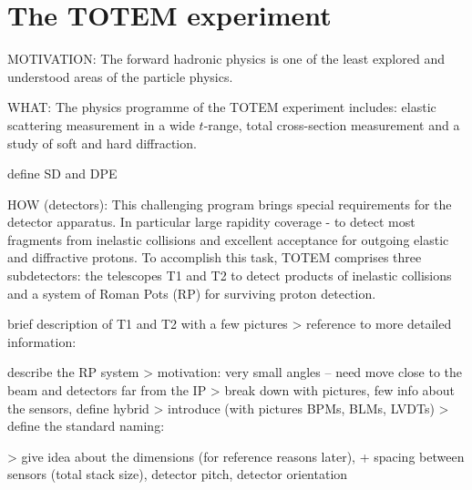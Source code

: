 \iffalse
TOTEM, RP, T1, T2, IP, BPM, BLM
\fi

\chapter[ttm]{The TOTEM experiment}

MOTIVATION: The forward hadronic physics is one of the least explored and understood areas of the particle physics.

WHAT: The physics programme of the TOTEM experiment includes:
\> elastic scattering measurement in a wide $t$-range,
\> total cross-section measurement and
\> a study of soft and hard diffraction.

\> define SD and DPE


HOW (detectors): This challenging program brings special requirements for the detector apparatus. In particular large rapidity coverage - to detect most fragments from inelastic collisions and excellent acceptance for outgoing elastic and diffractive protons. To accomplish this task, TOTEM comprises three subdetectors: the telescopes T1 and T2 to detect products of inelastic collisions and a system of Roman Pots (RP) for surviving proton detection.


\> brief description of T1 and T2 with a few pictures
\>> reference to more detailed information: 

\> describe the RP system
\>> motivation: very small angles -- need move close to the beam and detectors far from the IP
\>> break down with pictures, few info about the sensors, define hybrid
\>> introduce (with pictures BPMs, BLMs, LVDTs)
\>> define the standard naming: 


\>> give idea about the dimensions (for reference reasons later), + spacing between sensors (total stack size), detector pitch, detector orientation


